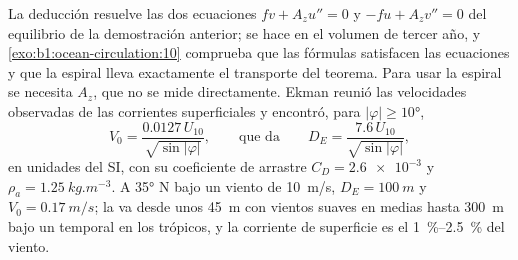 La deducción resuelve las dos ecuaciones $f v + A_z u'' = 0$ y $-f u + A_z v'' =
0$ del equilibrio de la demostración anterior; se hace en el volumen de tercer año, y
\cref{exo:b1:ocean-circulation:10} comprueba que las fórmulas satisfacen las ecuaciones y que la espiral lleva exactamente el transporte del teorema. Para usar la espiral se necesita $A_z$, que no se mide directamente. Ekman reunió las velocidades observadas de las corrientes superficiales y encontró, para $|\varphi| \geq \ang{10}$,
\[
  V_0 = \frac{0.0127\,U_{10}}{\sqrt{\sin|\varphi|}},
  \qquad\text{que da}\qquad
  D_E = \frac{7.6\,U_{10}}{\sqrt{\sin|\varphi|}},
\]
en unidades del SI, con su coeficiente de arrastre $C_D = \num{2.6e-3}$ y $\rho_a =
\qty{1.25}{kg.m^{-3}}$. A \ang{35} N bajo un viento de \qty{10}{m/s}, $D_E =
\qty{100}{m}$ y $V_0 = \qty{0.17}{m/s}$; la  va desde unos
\qty{45}{m} con vientos suaves en  medias hasta \qty{300}{m} bajo un temporal en los trópicos, y la corriente de superficie es el \qtyrange{1}{2.5}{\percent} del viento.

